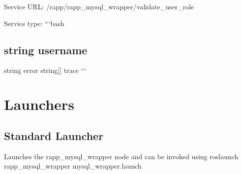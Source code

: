 Service U\-R\-L\-: {\ttfamily /rapp/rapp\-\_\-mysql\-\_\-wrapper/validate\-\_\-user\-\_\-role}

Service type\-: ```bash \subsection*{string username }

string error string\mbox{[}\mbox{]} trace ```

\section*{Launchers}

\subsection*{Standard Launcher}

Launches the rapp\-\_\-mysql\-\_\-wrapper node and can be invoked using {\ttfamily roslaunch rapp\-\_\-mysql\-\_\-wrapper mysql\-\_\-wrapper.\-launch} 